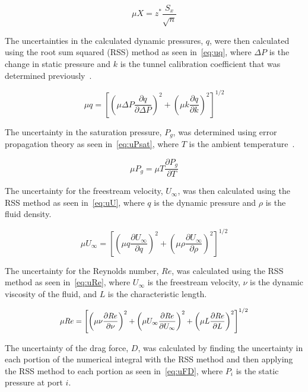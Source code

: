 \documentclass[journal,letterpaper]{IEEEtran}
\begin{document}
\begin{equation} \label{eq:conf}
    \mu X = z^* \frac{S_x}{\sqrt{n}}
\end{equation}

The uncertainties in the calculated dynamic pressures, $q$, were then calculated using the root sum squared (RSS) method as seen in~\eqref{eq:uq}, where $\Delta P$ is the change in static pressure and $k$ is the tunnel calibration coefficient that was determined previously~\cite{MoMLecture}.

\begin{equation} \label{eq:uq}
    \mu q = \left[\left(\mu \Delta P \frac{\partial q}{\partial \Delta P}\right)^2 + \left(\mu k \frac{\partial q}{\partial k}\right)^2\right]^{1/2}
\end{equation}

The uncertainty in the saturation pressure, $P_g$, was determined using error propagation theory as seen in~\eqref{eq:uPsat}, where $T$ is the ambient temperature~\cite{errorprop}.

\begin{equation} \label{eq:uPsat}
    \mu P_g = \mu T \frac{\partial P_g}{\partial T}
\end{equation}

The uncertainty for the freestream velocity, $U_\infty$, was then calculated using the RSS method as seen in~\eqref{eq:uU}, where $q$ is the dynamic pressure and $\rho$ is the fluid density.

\begin{equation} \label{eq:uU}
    \mu U_\infty = \left[\left(\mu q \frac{\partial U_\infty}{\partial q}\right)^2 + \left(\mu \rho \frac{\partial U_\infty}{\partial \rho}\right)^2\right]^{1/2}
\end{equation}

The uncertainty for the Reynolds number, $Re$, was calculated using the RSS method as seen in~\eqref{eq:uRe}, where $U_\infty$ is the freestream velocity, $\nu$ is the dynamic viscosity of the fluid, and $L$ is the characteristic length.

\begin{equation} \label{eq:uRe}
    \resizebox{227pt}{!}{$\displaystyle{\mu Re = \left[\left(\mu \nu \frac{\partial Re}{\partial \nu}\right)^2 + \left(\mu U_\infty \frac{\partial Re}{\partial U_\infty}\right)^2 + \left(\mu L \frac{\partial Re}{\partial L}\right)^2\right]^{1/2}}$}
\end{equation}

The uncertainty of the drag force, $D$, was calculated by finding the uncertainty in each portion of the numerical integral with the RSS method and then applying the RSS method to each portion as seen in~\eqref{eq:uFD}, where $P_i$ is the static pressure at port $i$.
\end{document}

